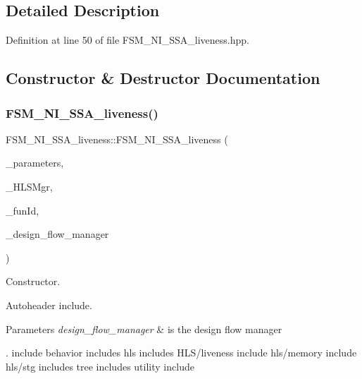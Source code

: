 \subsection{Detailed Description}


Definition at line 50 of file F\+S\+M\+\_\+\+N\+I\+\_\+\+S\+S\+A\+\_\+liveness.\+hpp.



\subsection{Constructor \& Destructor Documentation}
\mbox{\label{classFSM__NI__SSA__liveness_a52fd80199f84c554035ca0b2a50bf11e}} 
\subsubsection{\texorpdfstring{F\+S\+M\+\_\+\+N\+I\+\_\+\+S\+S\+A\+\_\+liveness()}{FSM\_NI\_SSA\_liveness()}}
{\footnotesize\ttfamily F\+S\+M\+\_\+\+N\+I\+\_\+\+S\+S\+A\+\_\+liveness\+::\+F\+S\+M\+\_\+\+N\+I\+\_\+\+S\+S\+A\+\_\+liveness (\begin{DoxyParamCaption}\item[{const \hyperlink{Parameter_8hpp_a37841774a6fcb479b597fdf8955eb4ea}{Parameter\+Const\+Ref}}]{\+\_\+parameters,  }\item[{const \hyperlink{hls__manager_8hpp_acd3842b8589fe52c08fc0b2fcc813bfe}{H\+L\+S\+\_\+manager\+Ref}}]{\+\_\+\+H\+L\+S\+Mgr,  }\item[{unsigned int}]{\+\_\+fun\+Id,  }\item[{const Design\+Flow\+Manager\+Const\+Ref}]{\+\_\+design\+\_\+flow\+\_\+manager }\end{DoxyParamCaption})}



Constructor. 

Autoheader include.


\begin{DoxyParams}{Parameters}
{\em design\+\_\+flow\+\_\+manager} & is the design flow manager\\
\hline
\end{DoxyParams}
. include behavior includes hls includes H\+L\+S/liveness include hls/memory include hls/stg includes tree includes utility include 

